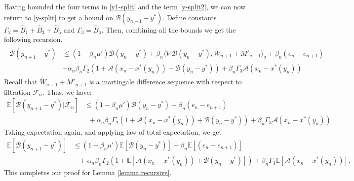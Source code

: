 \documentclass[letterpaper, 10 pt, conference]{ieeeconf}  %
\theoremstyle{definition}
\theoremstyle{plain}
\newcommand{\xstar}{x^*}
\newcommand{\ystar}{y^*}
\newcommand{\hB}{\hat{B}}
\newcommand{\EE}{\mathbb{E}}
\newcommand{\Acal}{\mathcal{A}}
\newcommand{\Bcal}{\mathcal{B}}
\begin{document}
Having bounded the four terms in \eqref{y1-split} and the term \eqref{y-split2}, we can now return to \eqref{y-split} to get a bound on $\Bcal(y_{n+1}-\ystar)$. Define constants $\Gamma_2=\hB_1+\hB_3+\hB_5$ and $\Gamma_3=\hB_4$. Then, combining all the bounds we get the following recursion.
\begin{align*}
\begin{split}
    \Bcal(y_{n+1}-\ystar)&\leq (1-\beta_n\mu')\Bcal(y_{n}-\ystar)+\beta_n\langle\nabla \Bcal(y_n-\ystar),{\widetilde{W}_{n+1}}+M'_{n+1}\rangle_2+\beta_n(e_n-e_{n+1})\\
    &+\alpha_n\beta_n\Gamma_2(1+\Acal(x_n-x^*(y_n))+\Bcal(y_n-y^*))+\beta_n\Gamma_3\Acal(x_n-\xstar(y_n))
\end{split}   
\end{align*}
Recall that ${\widetilde{W}_{n+1}}+M'_{n+1}$ is a martingale difference sequence with respect to filtration $\mathcal{F}_n$. Thus, we have:
\begin{align*}
    \EE[\Bcal(y_{n+1}-\ystar)|\mathcal{F}_n]&\leq (1-\beta_n\mu')\Bcal(y_{n}-\ystar)+\beta_n(e_n-e_{n+1})\\
    &\;\;+\alpha_n\beta_n\Gamma_2(1+\Acal(x_n-x^*(y_n))+\Bcal(y_n-y^*))+\beta_n\Gamma_3\Acal(x_n-\xstar(y_n))
\end{align*}
Taking expectation again, and applying law of total expectation, we get
\begin{align}\label{y-exp-rec-inter}
    \EE[\Bcal(y_{n+1}-\ystar)]&\leq(1-\beta_n\mu')\EE[\Bcal(y_{n}-\ystar)]+\beta_n\EE[(e_n-e_{n+1})]\nonumber\\
    &\;\;\;+\alpha_n\beta_n\Gamma_2(1+\EE[\Acal(x_n-x^*(y_n))+\Bcal(y_n-y^*)])+\beta_n\Gamma_3\EE[\Acal(x_n-\xstar(y_n))].
\end{align}
This completes our proof for Lemma \ref{lemma:recursive}.
\end{document}
